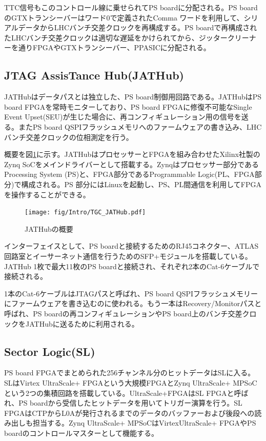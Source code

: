 TTC信号もこのコントロール線に乗せられてPS boardに分配される。PS boardのGTXトランシーバーはワード0で定義されたComma ワードを利用して、シリアルデータからLHCバンチ交差クロックを再構成する。PS boardで再構成されたLHCバンチ交差クロックは適切な遅延をかけられてから、ジッタークリーナーを通りFPGAやGTXトランシーバー、PPASICに分配される。

    \subsection*{JTAG AssisTance Hub(JATHub)}
JATHubはデータパスとは独立した、PS board制御用回路である。JATHubはPS board FPGAを常時モニターしており、PS board FPGAに修復不可能なSingle Event Upset(SEU)が生じた場合に、再コンフィギュレーション用の信号を送る。またPS board QSPIフラッシュメモリへのファームウェアの書き込み、LHCバンチ交差クロックの位相測定を行う。

概要を図\ref{TGC_JATHub}に示す。JATHubはプロセッサーとFPGAを組み合わせたXilinx社製のZynq SoCをメインドライバーとして搭載する。Zynqはプロセッサー部分であるProcessing System (PS)と、FPGA部分であるProgrammable Logic(PL、FPGA部分)で構成される。PS 部分にはLinuxを起動し、PS、PL間通信を利用してFPGAを操作することができる。

\begin{figure} 
\centering
\texttt{[image: fig/Intro/TGC\_JATHub.pdf]}
\caption[JATHubの概要]{JATHubの概要}
\label{TGC_JATHub}
\end{figure}

インターフェイスとして、PS boardと接続するためのRJ45コネクター、ATLAS回路室とイーサーネット通信を行うためのSFP+モジュールを搭載している。JATHub 1枚で最大11枚のPS boardと接続され、それぞれ2本のCat-6ケーブルで接続される。

1本のCat-6ケーブルはJTAGパスと呼ばれ、PS board QSPIフラッシュメモリーにファームウェアを書き込むのに使われる。もう一本はRecovery/Monitorパスと呼ばれ、PS boardの再コンフィギュレーションやPS board上のバンチ交差クロックをJATHubに送るために利用される。

    \subsection*{Sector Logic(SL)}
PS board FPGAでまとめられた256チャンネル分のヒットデータはSLに入る。SLはVirtex UltraScale+ FPGAという大規模FPGAとZynq UltraScale+ MPSoCという2つの集積回路を搭載している。UltraScale+FPGAはSL FPGAと呼ばれ、PS boardから受信したヒットデータを用いてトリガー演算を行う。SL FPGAはCTPからL0Aが発行されるまでのデータのバッファーおよび後段への読み出しも担当する。Zynq UltraScale+ MPSoCはVirtexUltraScale+ FPGAやPS boardのコントロールマスターとして機能する。

